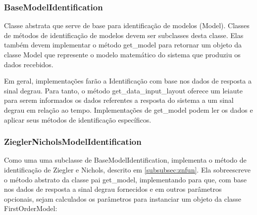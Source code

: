 \subsubsection{BaseModelIdentification}\label{subsubsec:devBaseModelIdentification}
Classe abstrata que serve de base para identificação de modelos (Model).
Classes de métodos de identificação de modelos devem ser subclasses desta classe.
Elas também devem implementar o método get\_model para retornar um objeto da classe Model que represente o modelo
matemático do sistema que produziu os dados recebidos.

Em geral, implementações farão a Identificação com base nos dados de resposta a sinal degrau.
Para tanto, o método get\_data\_input\_layout oferece um leiaute para serem informados os dados referentes a resposta
do sistema a um sinal degrau em relação ao tempo.
Implementações de get\_model podem ler os dados e aplicar seus métodos de identificação específicos.

\subsubsection{ZieglerNicholsModelIdentification}

Como uma uma subclasse de BaseModelIdentification, implementa o método de identificação de Ziegler e Nichols,
descrito em \ref{subsubsec:znfun}.
Ela sobreescreve o método abstrato da classe pai get\_model, implementando para que, com base nos dados de resposta a
sinal degrau fornecidos e em outros parâmetros opcionais, sejam calculados os parâmetros para instanciar um objeto da
classe FirstOrderModel:

